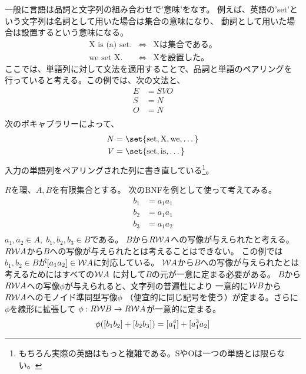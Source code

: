 	一般に言語は品詞と文字列の組み合わせで'意味'をなす。
	例えば、英語の'set'という文字列は名詞として用いた場合は集合の意味になり、
	動詞として用いた場合は設置するという意味になる。
	\begin{equation*}\begin{array}{lcl} %
		\text{X is (a) set.} &\iff& \text{Xは集合である。} \\
		\text{we set X.}　&\iff& \text{Xを設置した。}
	\end{array}\end{equation*} %
	ここでは、単語列に対して文法を適用することで、品詞と単語のペアリングを
	行っていると考える。この例では、次の文法と、
	\begin{equation*}\begin{split} %
		E &= SVO \\
		S &= N \\
		O &= N \\
	\end{split}\end{equation*} %
	次のボキャブラリーによって、
	\begin{equation*}\begin{split} %
		N &= \set{\text{set}, \text{X}, \text{we},\dots} \\
		V &= \set{\text{set}, \text{is},\dots} \\
	\end{split}\end{equation*} %
	入力の単語列をペアリングされた列に書き直している\footnote{
		もちろん実際の英語はもっと複雑である。SやOは一つの単語とは限らない。
	}。

	$R$を環、$A,B$を有限集合とする。
	次のBNFを例として使って考えてみる。
	\begin{equation}\label{eq:トークン分解のモデルの例その一}\begin{split} %
		b_1 &= a_1a_1 \\
		b_2 &= a_1a_1 \\
		b_3 &= a_1a_2 \\
	\end{split}\end{equation} %
	$a_1,a_2\in A,\;b_1,b_2,b_3\in B$である。
	$B$から$R\mathcal{W}{A}$への写像が与えられたと考える。
	$R\mathcal{W}{A}$から$B$への写像が与えられたとは考えることはできない。
	この例では$b_1,b_2\in B$が$[{a_1a_2}]\in \mathcal{W}{A}$に対応している。
	$\mathcal{W}{A}$から$B$への写像が与えられたとは考えるためにはすべての$\mathcal{W}{A}$
	に対して$B$の元が一意に定まる必要がある。
	$B$から$R\mathcal{W}{A}$への写像$\phi$が与えられると、文字列の普遍性により
	一意的に$\mathcal{W}{B}$から$R\mathcal{W}{A}$へのモノイド準同型写像$\phi$
	（便宜的に同じ記号を使う）が定まる。さらに$\phi$を線形に拡張して
	$\phi:R\mathcal{W}{B}\to R\mathcal{W}{A}$が一意的に定まる。
	\begin{equation*}\begin{split} %
		\phi(\word{b_1b_2} + \word{b_2b_3}) = \word{a_1^4} + \word{a_1^3a_2}
	\end{split}\end{equation*} %
	

